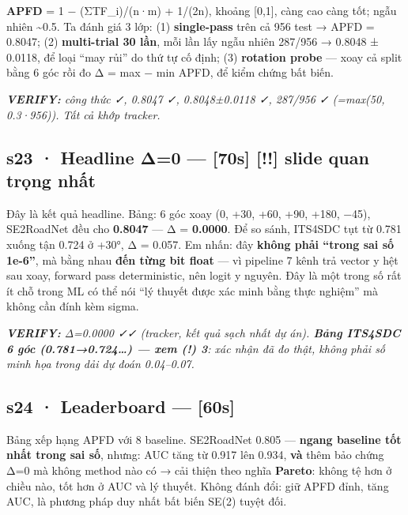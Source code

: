 \documentclass[
  11pt,
]{article}
\renewenvironment{quote}
  {\par\smallskip\noindent
   \def\FrameCommand{{\color{deckorange}\vrule width 2.5pt}\hspace{10pt}}%
   \MakeFramed{\advance\hsize-\width\FrameRestore}%
   \footnotesize\itshape\color{deckslate}}
  {\par\endMakeFramed\smallskip}
\begin{document}
\textbf{APFD} = 1 − (ΣTF\_i)/(n·m) + 1/(2n), khoảng {[}0,1{]}, càng cao
càng tốt; ngẫu nhiên \textasciitilde0.5. Ta đánh giá 3 lớp: (1)
\textbf{single-pass} trên cả 956 test → APFD = 0.8047; (2)
\textbf{multi-trial 30 lần}, mỗi lần lấy ngẫu nhiên 287/956 → 0.8048 ±
0.0118, để loại ``may rủi'' do thứ tự cố định; (3) \textbf{rotation
probe} --- xoay cả split bằng 6 góc rồi đo Δ = max − min APFD, để kiểm
chứng bất biến.

\begin{quote}
\textbf{VERIFY:} công thức ✓, 0.8047 ✓, 0.8048±0.0118 ✓, 287/956 ✓
(=max(50, 0.3·956)). Tất cả khớp tracker.
\end{quote}

\subsection{s23 · Headline Δ=0 --- {[}70s{]} {[}!!{]} slide quan trọng
nhất}\label{s23-headline-ux3b40-70s-slide-quan-trux1ecdng-nhux1ea5t}

Đây là kết quả headline. Bảng: 6 góc xoay (0, +30, +60, +90, +180, −45),
SE2RoadNet đều cho \textbf{0.8047} --- Δ = \textbf{0.0000}. Để so sánh,
ITS4SDC tụt từ 0.781 xuống tận 0.724 ở +30°, Δ = 0.057. Em nhấn: đây
\textbf{không phải ``trong sai số 1e-6''}, mà bằng nhau \textbf{đến từng
bit float} --- vì pipeline 7 kênh trả vector y hệt sau xoay, forward
pass deterministic, nên logit y nguyên. Đây là một trong số rất ít chỗ
trong ML có thể nói ``lý thuyết được xác minh bằng thực nghiệm'' mà
không cần đính kèm sigma.

\begin{quote}
\textbf{VERIFY:} Δ=0.0000 ✓✓ (tracker, kết quả sạch nhất dự án).
\textbf{Bảng ITS4SDC 6 góc (0.781→0.724\ldots) --- xem (!) 3}: xác nhận
đã đo thật, không phải số minh họa trong dải dự đoán 0.04--0.07.
\end{quote}

\subsection{s24 · Leaderboard --- {[}60s{]}}\label{s24-leaderboard-60s}

Bảng xếp hạng APFD với 8 baseline. SE2RoadNet 0.805 --- \textbf{ngang
baseline tốt nhất trong sai số}, nhưng: AUC tăng từ 0.917 lên 0.934,
\textbf{và} thêm bảo chứng Δ=0 mà không method nào có → cải thiện theo
nghĩa \textbf{Pareto}: không tệ hơn ở chiều nào, tốt hơn ở AUC và lý
thuyết. Không đánh đổi: giữ APFD đỉnh, tăng AUC, là phương pháp duy nhất
bất biến SE(2) tuyệt đối.
\end{document}
